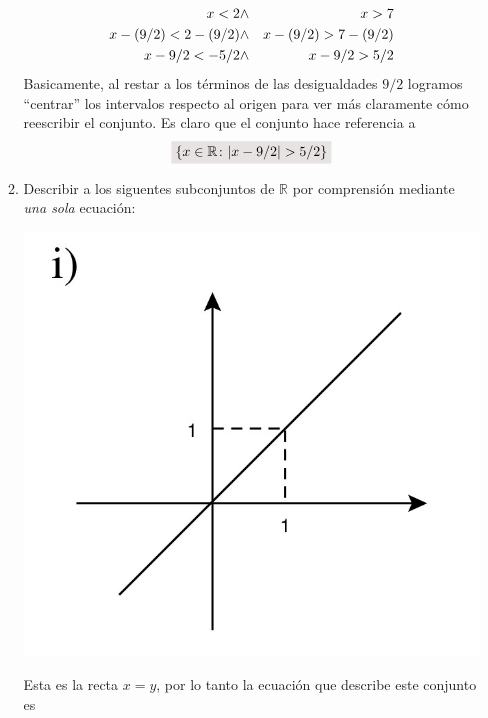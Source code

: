 \documentclass[a4paper,11pt]{article}
\newcommand{\real}{\mathbb{R}}
\newcommand{\resalta}[1]{\colorbox{g}{$\displaystyle #1$}}
\begin{document}
\begin{enumerate}
\begin{enumerate}[label = \roman*)]
           \begin{eqnarray*}
             \notag
                x<2&\wedge& x>7\\
                x-(9/2)<2-(9/2)&\wedge& x-(9/2)>7-(9/2)\\
                x -9/2<-5/2&\wedge& x-9/2>5/2
            \end{eqnarray*}
            Basicamente, al restar a los t\'erminos de las desigualdades $9/2$ logramos ``centrar'' los intervalos respecto al origen para ver m\'as claramente c\'omo reescribir el conjunto. Es claro que el conjunto hace referencia a
            \begin{equation}
                \notag\resalta{\{x \in \real \colon |x-9/2|>5/2\}}
            \end{equation}
            \item Describir a los siguentes subconjuntos de $\real$ por comprensi\'on mediante \textit{una sola} ecuaci\'on:\\
            \begin{minipage}[c]{0.3\linewidth}
                \centering
                    \includegraphics[scale=0.15]{4ii-1}
            \end{minipage}
            \begin{minipage}[c]{0.7\linewidth}
                Esta es la recta $x=y$, por lo tanto la ecuaci\'on que describe este conjunto es
                \begin{equation}

\end{equation}
\end{minipage}
\end{enumerate}
\end{enumerate}
\end{document}
